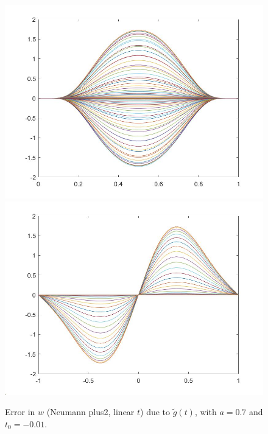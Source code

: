 \documentclass[11pt, a4paper]{article}
\theoremstyle{definition}
\begin{document}
\begin{figure}[h]
	\includegraphics[scale=0.3]{PerttimeN3.jpg}
	\includegraphics[scale=0.3]{PerttimeN4.jpg}
	\caption{Error in $w$ (Neumann plus2, linear $t$) due to $\tilde g(t)$, with $a =0.7$ and $t_0 = -0.01$.}
	\label{Perttime5}
\end{figure}
\end{document}
